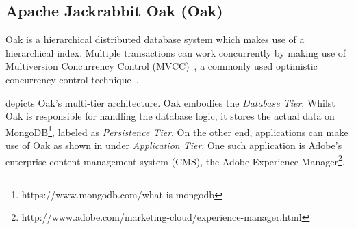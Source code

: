 \documentclass[abstracton,12pt]{scrartcl}
\theoremstyle{definition}
\begin{document}
\subsection{Apache Jackrabbit Oak (Oak)}

Oak is a hierarchical distributed database system which makes use of a hierarchical index. 
Multiple transactions can work concurrently by making use of Multiversion Concurrency Control (MVCC)~\cite{GW02}, a commonly used optimistic concurrency control technique~\cite{TM11}.

 depicts Oak's multi-tier architecture.
Oak embodies the \textit{Database Tier}.
Whilst Oak is responsible for handling the database logic, it stores the actual data on MongoDB\footnote{https://www.mongodb.com/what-is-mongodb}, labeled as \textit{Persistence Tier}.
On the other end, applications can make use of Oak as shown in  under \textit{Application Tier}.
One such application is Adobe's enterprise content management system (CMS), the Adobe Experience Manager\footnote{http://www.adobe.com/marketing-cloud/experience-manager.html}.
\end{document}
